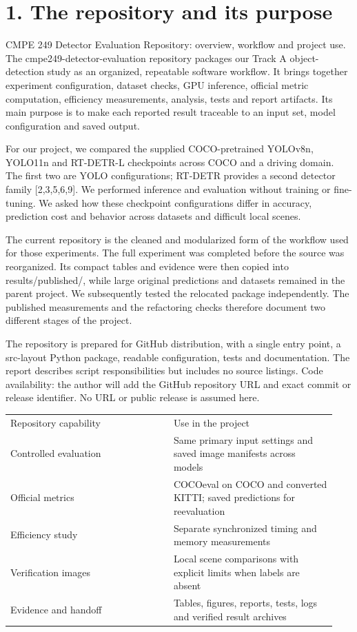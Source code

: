 \documentclass[10pt]{article}
\begin{document}
\section*{1. The repository and its purpose}
CMPE 249 Detector Evaluation Repository: overview, workflow and project use. The cmpe249-detector-evaluation repository packages our Track A object-detection study as an organized, repeatable software workflow. It brings together experiment configuration, dataset checks, GPU inference, official metric computation, efficiency measurements, analysis, tests and report artifacts. Its main purpose is to make each reported result traceable to an input set, model configuration and saved output.


For our project, we compared the supplied COCO-pretrained YOLOv8n, YOLO11n and RT-DETR-L checkpoints across COCO and a driving domain. The first two are YOLO configurations; RT-DETR provides a second detector family [2,3,5,6,9]. We performed inference and evaluation without training or fine-tuning. We asked how these checkpoint configurations differ in accuracy, prediction cost and behavior across datasets and difficult local scenes.


The current repository is the cleaned and modularized form of the workflow used for those experiments. The full experiment was completed before the source was reorganized. Its compact tables and evidence were then copied into results/published/, while large original predictions and datasets remained in the parent project. We subsequently tested the relocated package independently. The published measurements and the refactoring checks therefore document two different stages of the project.


The repository is prepared for GitHub distribution, with a single entry point, a src-layout Python package, readable configuration, tests and documentation. The report describes script responsibilities but includes no source listings. Code availability: the author will add the GitHub repository URL and exact commit or release identifier. No URL or public release is assumed here.


\begin{longtable}{p{0.470\linewidth}p{0.470\linewidth}}
Repository capability & Use in the project \\
Controlled evaluation & Same primary input settings and saved image manifests across models \\
Official metrics & COCOeval on COCO and converted KITTI; saved predictions for reevaluation \\
Efficiency study & Separate synchronized timing and memory measurements \\
Verification images & Local scene comparisons with explicit limits when labels are absent \\
Evidence and handoff & Tables, figures, reports, tests, logs and verified result archives \\
\end{longtable}
\clearpage
\end{document}
